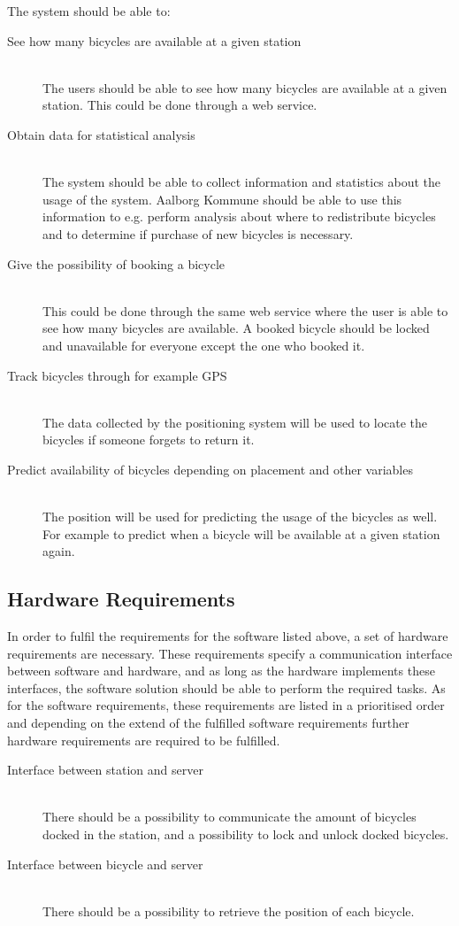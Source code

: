 The system should be able to:
\begin{description}
\item[See how many bicycles are available at a given station] \hfill \\
The users should be able to see how many bicycles are available at a given station.
This could be done through a web service.
\item[Obtain data for statistical analysis] \hfill \\
The system should be able to collect information and statistics about the usage of the system.
Aalborg Kommune should be able to use this information to e.g. perform analysis about where to redistribute bicycles and to determine if purchase of new bicycles is necessary.
\item[Give the possibility of booking a bicycle] \hfill \\
This could be done through the same web service where the user is able to see how many bicycles are available.
A booked bicycle should be locked and unavailable for everyone except the one who booked it.
\item[Track bicycles through for example GPS] \hfill \\
The data collected by the positioning system will be used to locate the bicycles if someone forgets to return it.
\item[Predict availability of bicycles depending on placement and other variables] \hfill \\
The position will be used for predicting the usage of the bicycles as well. 
For example to predict when a bicycle will be available at a given station again.
\end{description}

\subsection{Hardware Requirements}
In order to fulfil the requirements for the software listed above, a set of hardware requirements are necessary.
These requirements specify a communication interface between software and hardware, and as long as the hardware implements these interfaces, the software solution should be able to perform the required tasks.
As for the software requirements, these requirements are listed in a prioritised order and depending on the extend of the fulfilled software requirements further hardware requirements are required to be fulfilled.
\begin{description}
	\item[Interface between station and server]\hfill \\
	There should be a possibility to communicate the amount of bicycles docked in the station, and a possibility to lock and unlock docked bicycles.
	\item[Interface between bicycle and server]\hfill \\
	There should be a possibility to retrieve the position of each bicycle.
\end{description}